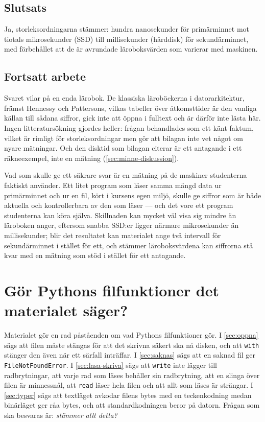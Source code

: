 \section{Slutsats}
\label{sec:minne-slutsats}

Ja, storleksordningarna stämmer: hundra nanosekunder för primärminnet
mot tiotals mikrosekunder (SSD) till millisekunder (hårddisk) för
sekundärminnet\autocite[kap.~22, 37 och 44]{ArpaciDusseau2025OSTEP},
med förbehållet att de är avrundade läroboksvärden som varierar med
maskinen.


\section{Fortsatt arbete}
\label{sec:minne-fortsatt}

Svaret vilar på en enda lärobok.  De klassiska läroböckerna i
datorarkitektur, främst Hennessy och Pattersons, vilkas tabeller över
åtkomsttider är den vanliga källan till sådana siffror, gick inte att
öppna i fulltext och är därför inte lästa här.  Ingen litteratursökning
gjordes heller: frågan behandlades som ett känt faktum, vilket är
rimligt för storleksordningar men gör att bilagan inte vet något om
nyare mätningar.  Och den disktid som bilagan citerar är ett antagande
i ett räkneexempel, inte en mätning (\cref{sec:minne-diskussion}).

Vad som skulle ge ett säkrare svar är en mätning på de maskiner
studenterna faktiskt använder.  Ett litet program som läser samma mängd
data ur primärminnet och ur en fil, kört i kursens egen miljö, skulle
ge siffror som är både aktuella och kontrollerbara av den som läser ---
och det vore ett program studenterna kan köra själva.  Skillnaden kan
mycket väl visa sig mindre än läroboken anger, eftersom snabba SSD:er
ligger närmare mikrosekunder än millisekunder; blir det resultatet kan
materialet ange två intervall för sekundärminnet i stället för ett, och
stämmer läroboksvärdena kan siffrorna stå kvar med en mätning som stöd
i stället för ett antagande.


\chapter{Gör Pythons filfunktioner det materialet säger?}
\label{app:dokumentation}

Materialet gör en rad påståenden om vad Pythons filfunktioner gör.  I
\cref{sec:oppna} sägs att filen måste stängas för att det skrivna säkert
ska nå disken, och att \texttt{with} stänger den även när ett
särfall inträffar.  I \cref{sec:saknas} sägs att en saknad fil ger
\texttt{FileNotFoundError}.  I \cref{sec:lasa-skriva} sägs
att \texttt{write} inte lägger till radbrytningar, att varje
rad som läses behåller sin radbrytning, att en slinga över filen är
minnessnål, att \texttt{read} läser hela filen och att allt
som läses är strängar.  I \cref{sec:typer} sägs att textläget avkodar
filens bytes med en teckenkodning medan binärläget ger råa bytes, och
att standardkodningen beror på datorn.  Frågan som ska besvaras är:
\emph{stämmer allt detta?}

